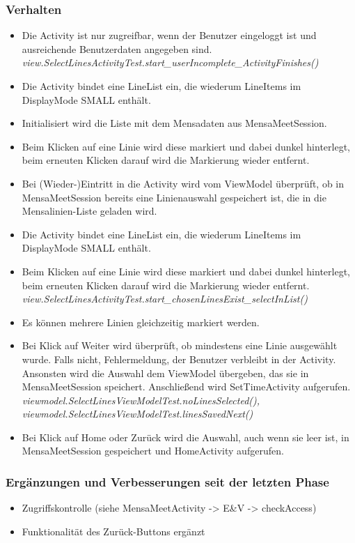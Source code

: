 \documentclass[a4paper]{scrreprt}
\begin{document}
\subsubsection{Verhalten}
\begin{itemize}
\item Die Activity ist nur zugreifbar, wenn der Benutzer eingeloggt ist und ausreichende Benutzerdaten angegeben sind. \\
\textit{view.SelectLinesActivityTest.start\_userIncomplete\_ActivityFinishes()}
\item Die Activity bindet eine LineList ein, die wiederum LineItems im DisplayMode SMALL enthält. 
\item Initialisiert wird die Liste mit dem Mensadaten aus MensaMeetSession.
\item Beim Klicken auf eine Linie wird diese markiert und dabei dunkel hinterlegt, beim erneuten Klicken darauf wird die Markierung wieder entfernt.
\item Bei (Wieder-)Eintritt in die Activity wird vom ViewModel überprüft, ob in MensaMeetSession bereits eine Linienauswahl gespeichert ist, die in die Mensalinien-Liste geladen wird.
\item Die Activity bindet eine LineList ein, die wiederum LineItems im DisplayMode SMALL enthält.
\item Beim Klicken auf eine Linie wird diese markiert und dabei dunkel hinterlegt, beim erneuten Klicken darauf wird die Markierung wieder entfernt. \\
\textit{view.SelectLinesActivityTest.start\_chosenLinesExist\_selectInList()}
\item Es können mehrere Linien gleichzeitig markiert werden.
\item Bei Klick auf Weiter wird überprüft, ob mindestens eine Linie ausgewählt wurde. Falls nicht, Fehlermeldung, der Benutzer verbleibt in der Activity. Ansonsten wird die Auswahl dem ViewModel übergeben, das sie in MensaMeetSession speichert. Anschließend wird SetTimeActivity aufgerufen.\\
\textit{viewmodel.SelectLinesViewModelTest.noLinesSelected(),
viewmodel.SelectLinesViewModelTest.linesSavedNext()}
\item Bei Klick auf Home oder Zurück wird die Auswahl, auch wenn sie leer ist, in MensaMeetSession gespeichert und HomeActivity aufgerufen.

\end{itemize}

\subsubsection{Ergänzungen und Verbesserungen seit der letzten Phase}
\begin{itemize}
\item Zugriffskontrolle (siehe MensaMeetActivity -> E\&V -> checkAccess)
\item Funktionalität des Zurück-Buttons ergänzt
\end{itemize}
\end{document}
